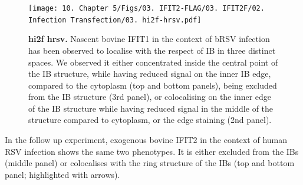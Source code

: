 \begin{figure}
    \centering
    \texttt{[image: 10. Chapter 5/Figs/03. IFIT2-FLAG/03. IFIT2F/02. Infection Transfection/03. hi2f-hrsv.pdf]}
    \caption[hi2f hrsv]{\textbf{hi2f hrsv.} Nascent bovine IFIT1 in the context of bRSV infection has been observed to localise with the respect of IB in three distinct spaces. We observed it either concentrated inside the central point of the IB structure, while having reduced signal on the inner IB edge, compared to the cytoplasm (top and bottom panels), being excluded from the IB structure (3rd panel), or colocalising on the inner edge of the IB structure while having reduced signal in the middle of the structure compared to cytoplasm, or the edge staining (2nd panel).}
    \label{fig:hi2f hrsv}
\end{figure}

In the follow up experiment, exogenous bovine IFIT2 in the context of human RSV infection shows the same two phenotypes. It is either excluded from the IBs (middle panel) or colocalises with the ring structure of the IBs (top and bottom panel; highlighted with arrows).

